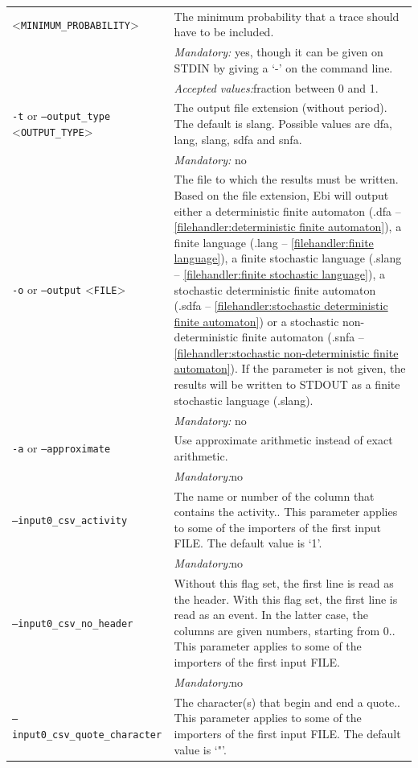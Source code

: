 {\begin{tabularx}{\linewidth}{lX}
<\texttt{MINIMUM\_PROBABILITY}>&The minimum probability that a trace should have to be included.\\
&\textit{Mandatory:} \quad yes, though it can be given on STDIN by giving a `-' on the command line.\\
&\textit{Accepted values:}\quad fraction between 0 and 1.\\
\texttt{-t} or \texttt{--output\_type} <\texttt{OUTPUT\_TYPE}> &
The output file extension (without period). The default is slang. Possible values are dfa, lang, slang, sdfa and snfa.\\
&\textit{Mandatory:} \quad no\\
\texttt{-o} or \texttt{--output} <\texttt{FILE}> &
The file to which the results must be written. Based on the file extension, Ebi will output either a deterministic finite automaton (.dfa -- \cref{filehandler:deterministic finite automaton}), a finite language (.lang -- \cref{filehandler:finite language}), a finite stochastic language (.slang -- \cref{filehandler:finite stochastic language}), a stochastic deterministic finite automaton (.sdfa -- \cref{filehandler:stochastic deterministic finite automaton}) or a stochastic non-deterministic finite automaton (.snfa -- \cref{filehandler:stochastic non-deterministic finite automaton}).
If the parameter is not given, the results will be written to STDOUT as a finite stochastic language (.slang).\\
&\textit{Mandatory:} \quad no\\
\texttt{-a} or \texttt{--approximate} & Use approximate arithmetic instead of exact arithmetic.\\
&\textit{Mandatory:}\quad no\\
\texttt{--input0\_csv\_activity} & The name or number of the column that contains the activity.. This parameter applies to some of the importers of the first input FILE. The default value is `1'.\\
&\textit{Mandatory:}\quad no\\
\texttt{--input0\_csv\_no\_header} & Without this flag set, the first line is read as the header. 
    With this flag set, the first line is read as an event. In the latter case, the columns are given numbers, starting from 0.. This parameter applies to some of the importers of the first input FILE. \\
&\textit{Mandatory:}\quad no\\
\texttt{--input0\_csv\_quote\_character} & The character(s) that begin and end a quote.. This parameter applies to some of the importers of the first input FILE. The default value is `"'.\\

\end{tabularx}}
